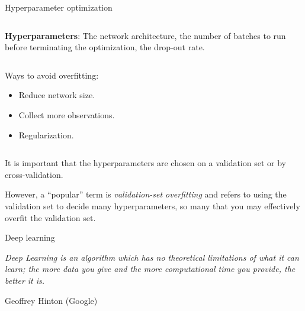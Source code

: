\documentclass[10pt,ignorenonframetext,]{beamer}
\begin{document}
\begin{frame}

\begin{block}{Hyperparameter optimization}

\(~\)

\textbf{Hyperparameters}: The network architecture, the number of
batches to run before terminating the optimization, the drop-out rate.

\(~\)

Ways to avoid overfitting:

\vspace{2mm}

\begin{itemize}
\item
  Reduce network size. \vspace{2mm}
\item
  Collect more observations. \vspace{2mm}
\item
  Regularization.
\end{itemize}

\(~\)

It is important that the hyperparameters are chosen on a validation set
or by cross-validation.

\vspace{2mm}

However, a ``popular'' term is \emph{validation-set overfitting} and
refers to using the validation set to decide many hyperparameters, so
many that you may effectively overfit the validation set.

\end{block}

\end{frame}

\begin{frame}{Deep learning}
\protect\hypertarget{deep-learning-1}{}

\emph{Deep Learning is an algorithm which has no theoretical limitations
of what it can learn; the more data you give and the more computational
time you provide, the better it is.}

Geoffrey Hinton (Google)

\end{frame}
\end{document}
